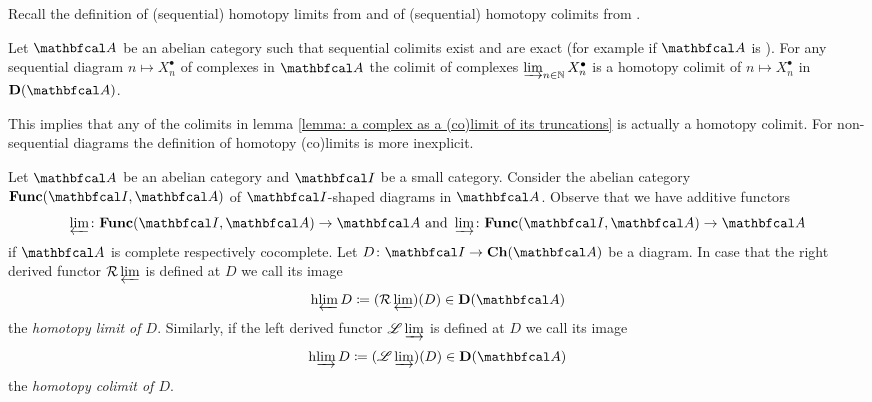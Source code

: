 Recall the definition of (sequential) homotopy limits from \cite[\href{https://stacks.math.columbia.edu/tag/08TC}{Tag 08TC}]{stacks-project} and of (sequential) homotopy colimits from \cite[\href{https://stacks.math.columbia.edu/tag/090Z}{Tag 090Z}]{stacks-project}.
\begin{lemma}
	\label{lemma: oridnary sequential colimits are homotopy limits}
	
	Let $\category{A}$ be an abelian category such that sequential colimits exist and are exact (for example if $\category{A}$ is  ). For any sequential diagram $n\mapsto X_n^\bullet$ of complexes in $\category{A}$ the colimit of complexes $\varinjlim_{n\in {\mathbb{N}}} X_n^\bullet$ is a homotopy colimit of $n\mapsto X_n^\bullet$ in $\derived{\category{A}}$.
\end{lemma}
This implies that any of the colimits in lemma \ref{lemma: a complex as a (co)limit of its truncations} is actually a homotopy colimit. For non-sequential diagrams the definition of homotopy (co)limits is more inexplicit.
\begin{definition}
	Let $\category{A}$ be an abelian category and $\category{I}$ be a small category. Consider the abelian category $\functorCategory{\category{I}}{\category{A}}$ of $\category{I}$-shaped diagrams in $\category{A}$. Observe that we have additive functors
		$$\limit\colon \functorCategory{\category{I}}{\category{A}} \to \category{A}\text{ and }\colimit\colon \functorCategory{\category{I}}{\category{A}}\to\category{A}$$
	if $\category{A}$ is complete respectively cocomplete. Let $D\colon \category{I} \to \complexes{\category{A}}$ be a diagram. In case that the right derived functor $\mathcal{R}\varprojlim$ is defined at $D$ we call its image
		$$\homotopyLimit D \ldef (\RightD\limit)(D) \in \derived{\category{A}}$$
	the \emph{homotopy limit of $D$}. Similarly, if the left derived functor $\mathscr{L}\varinjlim$ is defined at $D$ we call its image
		$$\homotopyColimit D\ldef (\LeftD \colimit)(D) \in \derived{\category{A}}$$
	the \emph{homotopy colimit of $D$}.
\end{definition}


